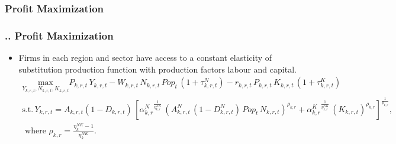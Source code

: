 \documentclass[11pt,aspectratio=169]{beamer}
\begin{document}
\subsubsection{Profit Maximization}
\begin{frame}
	\frametitle{{\thesection.\thesubsection.\thesubsubsection} Profit Maximization}
	\scriptsize
	\begin{itemize}
		\item Firms in each region and sector have access to a constant elasticity of substitution production function with production factors labour and capital.	
		\begin{align*}
		\underset{Y_{k,r,t}, N_{k,r,t}, K_{k,r,t}}{\mathrm{max}} P_{k,r,t} \, Y_{k,r,t} - W_{k,r,t} \, N_{k,r,t} \, Pop_{t} \, (1 + \tau^{N}_{k,r,t}) - r_{k,r,t} \, P_{k,r,t} \, K_{k,r,t} \, (1 + \tau^{K}_{k,r,t})\nonumber \\ 
		\mbox{s.t.} \, Y_{k,r,t} = A_{k,r,t} (1 - D_{k,r,t}) \, \left[{\alpha^{N}_{k,r}}^{\frac{1}{\eta^{NK}_{k,r}}} \, \left( A^{N}_{k,r,t} \, (1 - D^{N}_{k,r,t}) \, Pop_{t} \, N_{k,r,t}\right)^{\rho_{k,r}} + {\alpha^{K}_{k,r}}^{\frac{1}{\eta^{NK}_{k,r}}} \, \left(K_{k,r,t}\right)^{\rho_{k,r}}\right]^{\frac{1}{\rho_{k,r}}}, \nonumber \\
		\mbox{ where } \rho_{k,r} = \frac{\eta^{NK}_{k} - 1}{\eta^{NK}_{k}}.
		\end{align*}
	\end{itemize}
\end{frame}
\end{document}
